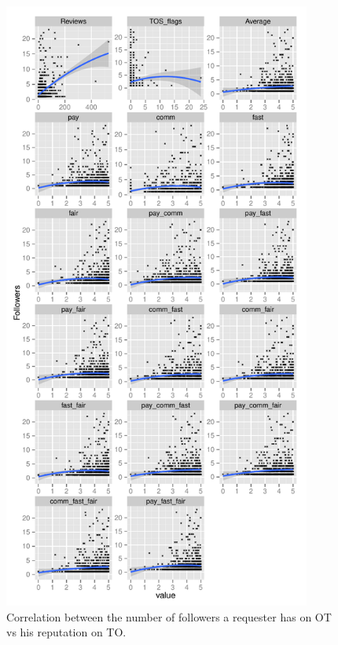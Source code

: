 \documentclass{llncs}
\begin{document}
\begin{figure}[htbp]
	\centering
		\includegraphics[width=0.9\textwidth]{figures/correlation}
	\caption{Correlation between the number of followers a requester has on OT vs his reputation on TO.}
	\label{fig:figure2}
\end{figure}
\end{document}
